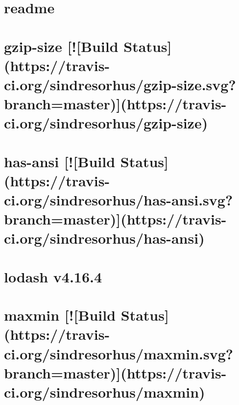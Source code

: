 \documentclass[twoside]{book}
\newcommand{\+}{\discretionary{\mbox{\scriptsize$\hookleftarrow$}}{}{}}
\begin{document}
\chapter{readme}
\label{md_app_web_node_modules_grunt-contrib-uglify_node_modules_chalk_readme}

\chapter{gzip-\/size \mbox{[}!\mbox{[}Build Status\mbox{]}(https\+://travis-\/ci.org/sindresorhus/gzip-\/size.svg?branch=master)\mbox{]}(https\+://travis-\/ci.org/sindresorhus/gzip-\/size)}
\label{md_app_web_node_modules_grunt-contrib-uglify_node_modules_gzip-size_readme}

\chapter{has-\/ansi \mbox{[}!\mbox{[}Build Status\mbox{]}(https\+://travis-\/ci.org/sindresorhus/has-\/ansi.svg?branch=master)\mbox{]}(https\+://travis-\/ci.org/sindresorhus/has-\/ansi)}
\label{md_app_web_node_modules_grunt-contrib-uglify_node_modules_has-ansi_readme}

\chapter{lodash v4.16.4}
\label{md_app_web_node_modules_grunt-contrib-uglify_node_modules_lodash__r_e_a_d_m_e}

\chapter{maxmin \mbox{[}!\mbox{[}Build Status\mbox{]}(https\+://travis-\/ci.org/sindresorhus/maxmin.svg?branch=master)\mbox{]}(https\+://travis-\/ci.org/sindresorhus/maxmin)}
\label{md_app_web_node_modules_grunt-contrib-uglify_node_modules_maxmin_readme}

\end{document}
